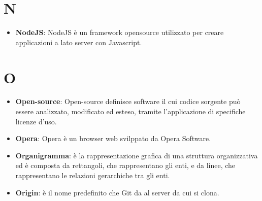 \documentclass[a4paper, oneside, openany]{article}
\begin{document}
\section{N}
\begin{itemize}
\item \textbf{NodeJS}: NodeJS è un framework opensource utilizzato per creare applicazioni a lato server con Javascript.
\end{itemize}

\section{O}
\begin{itemize}
\item \textbf{Open-source}: Open-source definisce software il cui codice sorgente può essere analizzato, modificato ed esteso, tramite l'applicazione di specifiche licenze d'uso.
\item \textbf{Opera}: Opera è un browser web svilppato da Opera Software.
\item \textbf{Organigramma}: è la rappresentazione grafica di una struttura organizzativa ed è composta da rettangoli, che rappresentano gli enti, e da linee, che rappresentano le relazioni gerarchiche tra gli enti.
\item \textbf{Origin}: è il nome predefinito che Git da al server da cui si clona.
\end{itemize}
\end{document}

